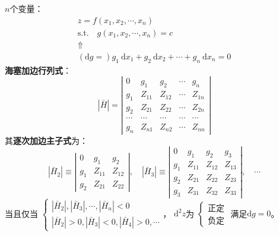 \documentclass[12pt, a4paper, oneside]{article}
\begin{document}
\begin{CJK*}{UTF8}{gbsn}
$n$个变量：
$$
\begin{array}{c}
	z=f\left(x_{1}, x_{2}, \cdots, x_{n}\right)
	\\
	\text{s.t.} \quad
	g\left(x_{1}, x_{2}, \cdots, x_{n}\right)=c
	\\
	\Uparrow
	\\
	(\mathrm{d} g=) g_{1} \mathrm{~d} x_{1}+g_{2} \mathrm{~d} x_{2}+\cdots+g_{n} \mathrm{~d} x_{n}=0
\end{array}
$$
\textbf{海塞加边行列式}：
$$
|\bar{H}|=
\left|
\begin{array}{ccccc}
	0 & g_{1} & g_{2} & \cdots & g_{n} \\
	g_{1} & Z_{11} & Z_{12} & \cdots & Z_{1 n} \\
	g_{2} & Z_{21} & Z_{22} & \cdots & Z_{2 n} \\
	\cdots &\cdots &\cdots &\cdots &\cdots \\
	g_{n} & Z_{n 1} & Z_{n 2} & \cdots & Z_{n n}
\end{array}
\right|
$$
其\textbf{逐次加边主子式}为：
$$
\left|\bar{H}_{2}\right| \equiv
\left|
\begin{array}{lll}
	0 & g_{1} & g_{2} \\
	g_{1} & Z_{11} & Z_{12} \\
	g_{2} & Z_{21} & Z_{22}
\end{array}
\right|,\quad
\left|\bar{H}_{3}\right| \equiv
\left|
\begin{array}{cccc}
	0 & g_{1} & g_{2} & g_{3} \\
	g_{1} & Z_{11} & Z_{12} & Z_{13} \\
	g_{2} & Z_{21} & Z_{22} & Z_{23} \\
	g_{3} & Z_{31} & Z_{32} & Z_{33}
\end{array}
\right|,\quad
\cdots
$$
当且仅当
$
\left\{\begin{array}{l}
	\left|\bar{H}_{2}\right|,\left|\bar{H}_{3}\right|, \cdots,\left|\bar{H}_{n}\right|<0 \\
	 \left|\bar{H}_{2}\right|>0 , \left|\bar{H}_{3}\right|<0 , \left|\bar{H}_{4}\right|>0, \cdots
 \end{array}\right.
$，
$\mathrm{d}^2 z$为
$
\left\{\begin{array}{l}
	\text{正定}\\
	\text{负定}
\end{array}\right.	
$
满足$\mathrm{d}g=0$。
\newline


\end{CJK*}
\end{document}
